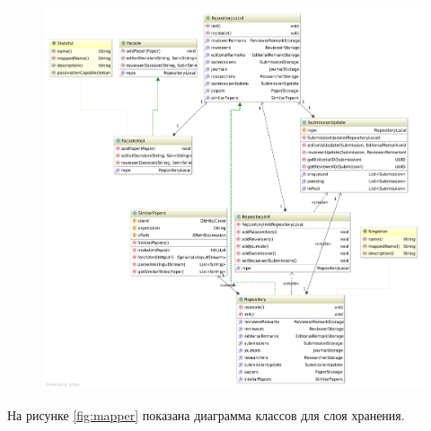 \begin{figure}[H]
\centering
\includegraphics[width=\textwidth]{diagram2.pdf}
\caption{}
\end{figure}

На рисунке \ref{fig:mapper} показана диаграмма классов для слоя хранения.

